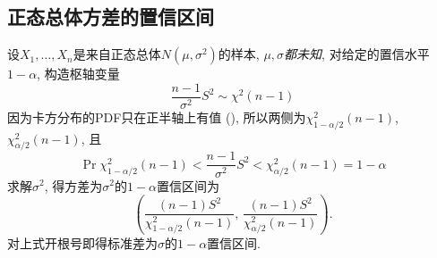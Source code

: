 \subsection{正态总体方差的置信区间}
设$X_1,\ldots,X_n$是来自正态总体$N(\mu,\sigma^2)$的样本, $\mu,\sigma$\emph{都未知}, 对给定的置信水平$1-\alpha$, 构造枢轴变量
\[
    \dfrac{n-1}{\sigma^2}S^2\sim \chi^2(n-1)
\]
因为卡方分布的PDF只在正半轴上有值 (), 所以两侧为$\chi^2_{1-\alpha/2}(n-1)$, $\chi^2_{\alpha/2}(n-1)$, 且
\[
    \Pr{\chi^2_{1-\alpha/2}(n-1)< \dfrac{n-1}{\sigma^2}S^2<\chi^2_{\alpha/2}(n-1)} = 1 -\alpha
\]
求解$\sigma^2$, 得方差为$\sigma^2$的$1-\alpha$置信区间为
\begin{equation}
    \left(\dfrac{(n-1)S^2}{\chi^2_{1-\alpha/2}(n-1)},\,\dfrac{(n-1)S^2}{\chi^2_{\alpha/2}(n-1)}\right).
\end{equation}
对上式开根号即得标准差为$\sigma$的$1-\alpha$置信区间.
